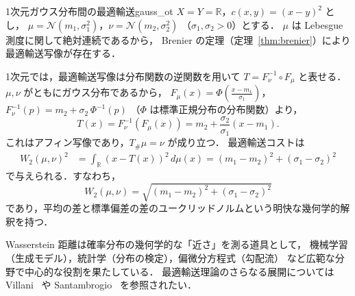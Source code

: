 \documentclass[uplatex, dvipdfmx]{jsarticle}
\begin{document}
\begin{example}{1次元ガウス分布間の最適輸送}{gauss_ot}
$X=Y=\mathbb{R}$，$c(x,y)=(x-y)^2$ とし，
$\mu=\mathcal{N}(m_1,\sigma_1^2)$，$\nu=\mathcal{N}(m_2,\sigma_2^2)$
（$\sigma_1,\sigma_2>0$）とする．
$\mu$ は Lebesgue 測度に関して絶対連続であるから，
Brenier の定理（定理~\ref{thm:brenier}）により最適輸送写像が存在する．

1次元では，最適輸送写像は分布関数の逆関数を用いて
$T=F_\nu^{-1}\circ F_\mu$ と表せる．
$\mu,\nu$ がともにガウス分布であるから，
$F_\mu(x)=\Phi\!\left(\frac{x-m_1}{\sigma_1}\right)$，
$F_\nu^{-1}(p)=m_2+\sigma_2\,\Phi^{-1}(p)$
（$\Phi$ は標準正規分布の分布関数）より，
\[
  T(x)=F_\nu^{-1}(F_\mu(x))
  = m_2 + \frac{\sigma_2}{\sigma_1}(x-m_1).
\]
これはアフィン写像であり，$T_\#\mu=\nu$ が成り立つ．
最適輸送コストは
\begin{align*}
  W_2(\mu,\nu)^2
  &= \int_{\mathbb{R}} (x-T(x))^2\,d\mu(x)
  = (m_1-m_2)^2 + (\sigma_1-\sigma_2)^2
\end{align*}
で与えられる．すなわち，
\[
  \boxed{W_2(\mu,\nu) = \sqrt{(m_1-m_2)^2 + (\sigma_1-\sigma_2)^2}}
\]
であり，平均の差と標準偏差の差のユークリッドノルムという明快な幾何学的解釈を持つ．

\begin{center}
\end{center}
\end{example}

Wasserstein 距離は確率分布の幾何学的な「近さ」を測る道具として，
機械学習（生成モデル），統計学（分布の検定），偏微分方程式（勾配流）
など広範な分野で中心的な役割を果たしている．
最適輸送理論のさらなる展開については
Villani~\cite{Villani2009} や Santambrogio~\cite{Santambrogio2015} を参照されたい．
\end{document}
